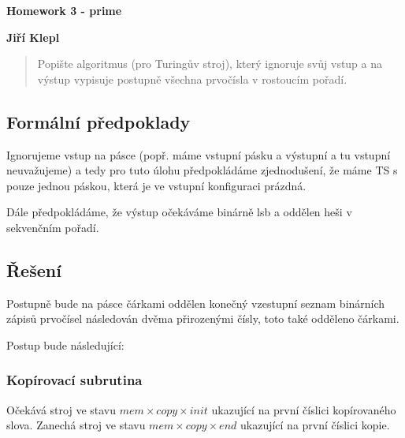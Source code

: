 \documentclass[a4paper,12pt]{article} %
\begin{document}
\thispagestyle{empty} %

\begin{center}
    {\Large \bf Homework 3 - prime}
    \vspace{2mm}

    {\bf Jiří Klepl}

\end{center}

\vspace{0.4cm}


\begin{quote}
    Popište algoritmus (pro Turingův stroj), který ignoruje svůj vstup a na výstup vypisuje postupně všechna prvočísla v rostoucím pořadí.
\end{quote}

\subsection*{Formální předpoklady}

Ignorujeme vstup na pásce (popř. máme vstupní pásku a výstupní a tu vstupní neuvažujeme) a tedy pro tuto úlohu předpokládáme zjednodušení, že máme TS s pouze jednou páskou, která je ve vstupní konfiguraci prázdná.

Dále předpokládáme, že výstup očekáváme binárně lsb a oddělen heši v sekvenčním pořadí.

\subsection*{Řešení}

Postupně bude na pásce čárkami oddělen konečný vzestupní seznam binárních zápisů prvočísel následován dvěma přirozenými čísly, toto také odděleno čárkami.

Postup bude následující:

\subsubsection*{Kopírovací subrutina}

Očekává stroj ve stavu $mem \times copy \times init$ ukazující na první číslici kopírovaného slova. Zanechá stroj ve stavu $mem \times copy \times end$ ukazující na první číslici kopie.
\end{document}
